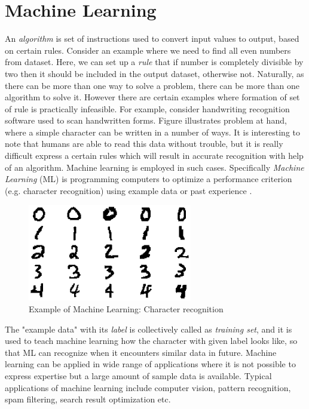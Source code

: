 \chapter{Machine Learning}
\label{chap:chapter3}
An \emph{algorithm} is set of instructions used to convert input values to output, based on certain rules. Consider an example where we need to find all even numbers from dataset. Here, we can set up a \emph{rule} that if number is completely divisible by two then it should be included in the output dataset, otherwise not. Naturally, as there can be more than one way to solve a problem, there can be more than one algorithm to solve it. However there are certain examples where formation of set of rule is practically infeasible. For example, consider handwriting recognition software used to scan handwritten forms. Figure illustrates problem at hand, where a simple character can be written in a number of ways. It is interesting to note that humans are able to read this data without trouble, but it is really difficult express a certain rules which will result in accurate recognition with help of an algorithm. Machine learning is employed in such cases. Specifically \emph{Machine Learning} (ML) is programming computers to optimize a performance criterion (e.g. character recognition) using example data or past experience \cite{Alpaydin2004}. 

\begin{figure}[h]
  \begin{center}
    \captionsetup{justification=centering}
    \includegraphics[scale=0.5]{figures/charrec.png}
    \caption{Example of Machine Learning: Character recognition}
    \label{fig:charrec}
  \end{center}
\end{figure}

The "example data" with its \emph{label} is collectively called as \emph{training set}, and it is used to teach machine learning how the character with given label looks like, so that ML can recognize when it encounters similar data in future. Machine learning can be applied in wide range of applications where it is not possible to express expertise but a large amount of sample data is available. Typical applications of machine learning include computer vision, pattern recognition, spam filtering, search result optimization etc. 

